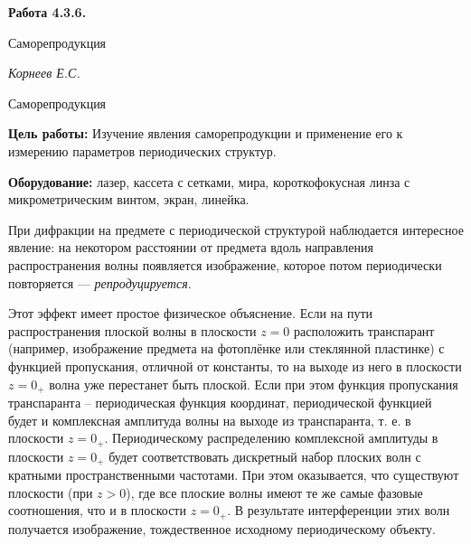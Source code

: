 \documentclass[14pt]{article}
\begin{document}
\begin{titlepage}
	\begin{center}
		\fontsize{18pt}{20pt}\selectfont
		\textbf{Работа 4.3.6.}	
	
		\vspace{5cm}
		\fontsize{24pt}{25pt}\selectfont
		Саморепродукция
	\end{center}
	\begin{flushright}
		\fontsize{18pt}{20pt}\selectfont
		\vspace{14cm}
		\hspace{-3cm}
		\textit{Корнеев Е.С.}
	\end{flushright}		
\end{titlepage}

\begin{center}
	\fontsize{16pt}{18pt}\selectfont	
	Саморепродукция
\end{center}


\fontsize{14pt}{16pt}\selectfont
\vspace{1cm}
\textbf{Цель работы:} Изучение явления саморепродукции и применение его к измерению параметров периодических структур.

\vspace{1cm}
\textbf{Оборудование:} лазер, кассета с сетками, мира, короткофокусная
линза с микрометрическим винтом, экран, линейка.

\vspace{1cm}

При дифракции на предмете с периодической структурой наблюдается
интересное явление: на некотором расстоянии от предмета
вдоль направления распространения волны появляется изображение,
которое потом периодически повторяется — \textsl{репродуцируется}.


Этот эффект имеет простое физическое объяснение. Если на
пути распространения плоской волны в плоскости $z = 0$ расположить
транспарант (например, изображение предмета на фотоплёнке
или стеклянной пластинке) с функцией пропускания, отличной
от константы, то на выходе из него в плоскости $z = 0_+$
волна уже перестанет быть плоской. Если при этом функция пропускания
транспаранта -- периодическая функция координат, периодической
функцией будет и комплексная амплитуда волны на
выходе из транспаранта, т. е. в плоскости $z = 0_+$. Периодическому
распределению комплексной амплитуды в плоскости $z = 0_+$
будет соответствовать дискретный набор плоских волн с кратными
пространственными частотами. При этом оказывается, что существуют
плоскости (при $z > 0$), где все плоские волны имеют
те же самые фазовые соотношения, что и в плоскости $z = 0_+$.
В результате интерференции этих волн получается изображение,
тождественное исходному периодическому объекту.
\end{document}
